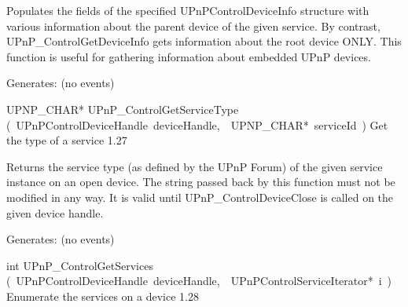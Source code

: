 \documentclass{article}
\begin{document}
\begin{cxxentry}
\begin{cxxfunction}
\begin{cxxdoc}
Populates the fields of the specified UPnPControlDeviceInfo
structure with various information about the parent device of the
given service.  By contrast, UPnP\_ControlGetDeviceInfo gets
information about the root device ONLY.  This function is useful for
gathering information about embedded UPnP devices.

Generates:
(no events)


\end{cxxdoc}
\end{cxxfunction}
\begin{cxxfunction}
{UPNP\_CHAR*}
        {UPnP\_ControlGetServiceType}
        {(\ UPnPControlDeviceHandle\ deviceHandle,\ \ UPNP\_CHAR*\ serviceId\ )}
        {Get the type of a service }
        {1.27}
\begin{cxxdoc}

Returns the service type (as defined by the UPnP Forum) of the given
service instance on an open device.  The string passed back by this
function must not be modified in any way.  It is valid until
UPnP\_ControlDeviceClose is called on the given device handle.

Generates:
(no events)


\end{cxxdoc}
\end{cxxfunction}
\begin{cxxfunction}
{int}
        {UPnP\_ControlGetServices}
        {(\ UPnPControlDeviceHandle\ deviceHandle,\ \ UPnPControlServiceIterator*\ i\ )}
        {Enumerate the services on a device }
        {1.28}
\begin{cxxdoc}


\end{cxxdoc}
\end{cxxfunction}
\end{cxxentry}
\end{document}
